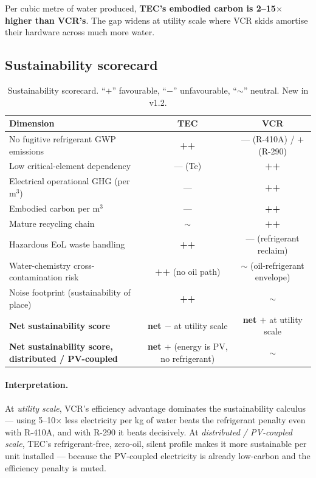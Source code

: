 \documentclass[11pt,a4paper]{article}
\begin{document}
\noindent
Per cubic metre of water produced, \textbf{TEC's embodied carbon is 2--15$\times$ higher than VCR's}. The gap widens at utility scale where VCR skids amortise their hardware across much more water.

\subsection{Sustainability scorecard}
\begin{table}[h]
\centering\small
\caption{Sustainability scorecard. ``$+$'' favourable, ``$-$'' unfavourable, ``$\sim$'' neutral. New in v1.2.}
\label{tab:scorecard}
\begin{tabular}{@{}lcc@{}}
\toprule
\textbf{Dimension} & \textbf{TEC} & \textbf{VCR}\\
\midrule
No fugitive refrigerant GWP emissions       & \textbf{++} & --- (R-410A) / $+$ (R-290) \\
Low critical-element dependency             & --- (Te)    & \textbf{++} \\
Electrical operational GHG (per m$^3$)      & ---         & \textbf{++} \\
Embodied carbon per m$^3$                   & ---         & \textbf{++} \\
Mature recycling chain                      & $\sim$      & \textbf{++} \\
Hazardous EoL waste handling                & \textbf{++} & --- (refrigerant reclaim) \\
Water-chemistry cross-contamination risk    & \textbf{++} (no oil path) & $\sim$ (oil-refrigerant envelope) \\
Noise footprint (sustainability of place)   & \textbf{++} & $\sim$ \\
\midrule
\textbf{Net sustainability score}           & \textbf{net $-$} at utility scale & \textbf{net $+$} at utility scale \\
\textbf{Net sustainability score, distributed / PV-coupled} & \textbf{net $+$} (energy is PV, no refrigerant) & $\sim$ \\
\bottomrule
\end{tabular}
\end{table}

\paragraph{Interpretation.} At \emph{utility scale}, VCR's efficiency advantage dominates the sustainability calculus --- using 5--10$\times$ less electricity per kg of water beats the refrigerant penalty even with R-410A, and with R-290 it beats decisively. At \emph{distributed / PV-coupled scale}, TEC's refrigerant-free, zero-oil, silent profile makes it more sustainable per unit installed --- because the PV-coupled electricity is already low-carbon and the efficiency penalty is muted.
\end{document}
